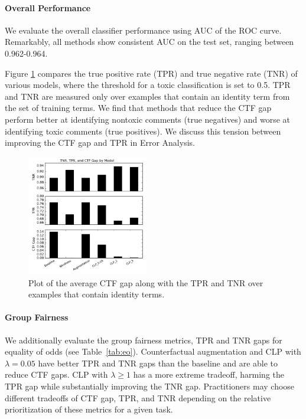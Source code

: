 \documentclass[letterpaper]{article} %
\theoremstyle{definition}
\begin{document}
\paragraph {Overall Performance}
We evaluate the overall classifier performance using AUC of the ROC curve. Remarkably, all methods show consistent AUC on the test set, ranging between 0.962-0.964. 

Figure \ref{fig:tprtnr} compares the true positive rate (TPR) and true negative rate (TNR) of various models, where the threshold for a toxic classification is set to 0.5. TPR and TNR are measured only over examples that contain an identity term from the set of training terms. We find that methods that reduce the CTF gap perform better at identifying nontoxic comments (true negatives) and worse at identifying toxic comments (true positives). We discuss this tension between improving the CTF gap and TPR in Error Analysis. 

\begin{figure}[h]

    \centering  
    \includegraphics[width=0.47\textwidth]{ctf_tpr_tnr.png}
    \caption{Plot of the average CTF gap along with the TPR and TNR over examples that contain identity terms.}
    \label{fig:tprtnr}
    \end{figure}

\paragraph{Group Fairness}
We additionally evaluate the group fairness metrics, TPR and TNR gaps for equality of odds (see Table~\ref{tab:eo}). Counterfactual augmentation and CLP with $\lambda=0.05$ have better TPR and TNR gaps than the baseline and are able to reduce CTF gaps. CLP with $\lambda \geq 1$ has a more extreme tradeoff, harming the TPR gap while substantially improving the TNR gap. Practitioners may choose different tradeoffs of CTF gap, TPR, and TNR depending on the relative prioritization of these metrics for a given task. 
\end{document}
